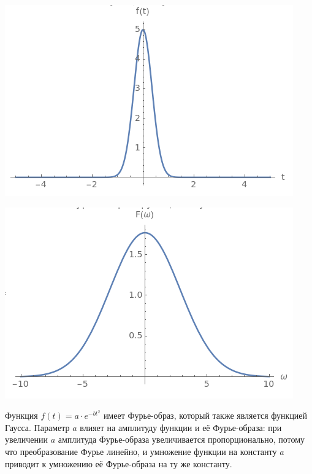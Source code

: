 \documentclass[a4paper,12pt]{article}
\begin{document}
\begin{center}
\begin{minipage}{0.48\textwidth}
  \centering
  \includegraphics[width=\linewidth]{images/4f54.png}
\end{minipage}
\hfill
\begin{minipage}{0.48\textwidth}
  \centering
  \includegraphics[width=\linewidth]{images/4F54.png}
\end{minipage}
\end{center}

Функция \( f(t) = a \cdot e^{-b t^2} \) имеет Фурье-образ, который также является функцией Гаусса. Параметр \( a \) влияет на амплитуду функции и её Фурье-образа: при увеличении \( a \) амплитуда Фурье-образа увеличивается пропорционально, потому что преобразование Фурье линейно, и умножение функции на константу \( a \) приводит к умножению её Фурье-образа на ту же константу.
\end{document}

